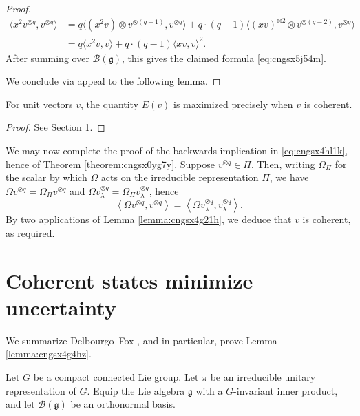 \documentclass[reqno]{amsart} 
\begin{document}
\begin{proof}
  \begin{align*}
    \label{eq:1}
    \langle x^{2}v^{\otimes q}, v^{\otimes q}\rangle&=
                              q \langle (x^{2}v)\otimes v^{\otimes (q-1)} , v^{\otimes q}\rangle
                              + q\cdot (q-1) \langle(x v)^{\otimes 2}\otimes v^{\otimes (q-2)},v^{\otimes q}\rangle\\
                            &= q \langle x^{2}v,v\rangle+q\cdot (q-1) \langle x v,v\rangle^{2}.
  \end{align*}
  After summing over $ \mathcal{B}(\mathfrak{g}) $, this gives the claimed formula \eqref{eq:cngsx5j54m}.

  We conclude via appeal to the following lemma.
\end{proof}

\begin{lemma}\label{lemma:cngsx4g4hz}
  For unit vectors $v$, the quantity $E(v)$ is maximized precisely when $v$ is coherent.
\end{lemma}
\begin{proof}
  See Section \ref{sec:cngsx6buyy}.
\end{proof}


We may now complete the proof of the backwards implication in \eqref{eq:cngsx4hl1k}, hence of Theorem \ref{theorem:cngsx0yg7y}.  Suppose $v^{\otimes q} \in \Pi$.  Then, writing $\Omega_\Pi$ for the scalar by which $\Omega$ acts on the irreducible representation $\Pi$, we have $\Omega v^{\otimes q} = \Omega_\Pi v^{\otimes q}$ and $\Omega v_\lambda^{\otimes q} = \Omega_\Pi v_\lambda^{\otimes q}$, hence
\begin{equation*}
  \left\langle \Omega v^{\otimes q}, v^{\otimes q} \right\rangle
  =
  \left\langle \Omega v_\lambda^{\otimes q}, v_\lambda^{\otimes q} \right\rangle.
\end{equation*}
By two applications of Lemma \ref{lemma:cngsx4g21h}, we deduce that $v$ is coherent, as required.


\section{Coherent states minimize uncertainty}\label{sec:cngsx6buyy}
We summarize Delbourgo--Fox \cite{MR0480888}, and in particular, prove Lemma \ref{lemma:cngsx4g4hz}.

Let $G$ be a compact connected Lie group.  Let $\pi$ be an irreducible unitary representation of $G$.  Equip the Lie algebra $\mathfrak{g}$ with a $G$-invariant inner product, and let $\mathcal{B}(\mathfrak{g})$ be an orthonormal basis.
\end{document}
